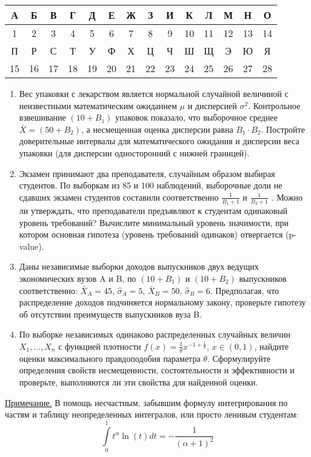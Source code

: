 \begin{center}
\begin{tabular}{|c|c|c|c|c|c|c|c|c|c|c|c|c|c|}
\hline  А & Б & В & Г & Д & Е & Ж & З & И & К & Л & М & Н & О \\
\hline 1 & 2 & 3 & 4 & 5 & 6 & 7 & 8 & 9 & 10 & 11 & 12 & 13 & 14 \\
\hline  П & Р & С & Т & У & Ф & Х & Ц & Ч & Ш & Щ & Э & Ю & Я \\
\hline 15& 16  &  17 &  18&  19&  20&  21& 22 & 23 &  24& 25 & 26  &  27 & 28 \\
\hline
\end{tabular}
\end{center}

\begin{enumerate}
\item Вес упаковки с лекарством является нормальной случайной величиной с
неизвестными математическим ожиданием  $\mu$ и дисперсией $\sigma^2$. Контрольное
взвешивание $(10+B_1)$ упаковок показало, что выборочное среднее  $\bar{X} =
(50+B_2)$, а  несмещенная оценка дисперсии равна $B_1\cdot B_2$. Постройте
доверительные интервалы для математического ожидания и дисперсии веса упаковки
(для дисперсии односторонний с нижней границей).

\item Экзамен принимают два преподавателя, случайным образом выбирая студентов.
По выборкам из 85 и 100 наблюдений, выборочные доли не сдавших экзамен студентов
составили соответственно $\frac{1}{B_1+1}$ и $\frac{1}{B_2+1}$ . Можно ли утверждать,
что преподаватели предъявляют к студентам одинаковый уровень требований? Вычислите
минимальный уровень значимости, при котором основная гипотеза (уровень требований одинаков)
отвергается (p-value).

\item Даны независимые выборки доходов выпускников двух ведущих экономических вузов
A и B, по $(10+B_1)$ и $(10+B_2)$ выпускников соответственно: $\bar{X}_A=45$,
$\hat{\sigma}_A=5$, $\bar{X}_B=50$, $\hat{\sigma}_B=6$.
Предполагая, что распределение доходов подчиняется нормальному закону, проверьте
гипотезу об отсутствии преимуществ выпускников вуза B.

\item 	По выборке независимых одинаково распределенных случайных величин
$X_1,\dots,X_n$ с функцией плотности $f(x)=\frac{1}{\theta} x^{-1+\frac{1}{\theta}}$,
$x\in(0, 1)$, найдите оценки максимального правдоподобия параметра $\theta$.
Сформулируйте определения свойств несмещенности, состоятельности и эффективности
и проверьте, выполняются ли эти свойства для найденной оценки.
\end{enumerate}
\underline{Примечание.} В помощь несчастным, забывшим формулу интегрирования по
частям и таблицу неопределенных интегралов, или просто ленивым студентам:
\[
\int\limits_{0}^1 t^\alpha \ln (t) dt = -\frac{1}{(\alpha+1)^2}
\]
